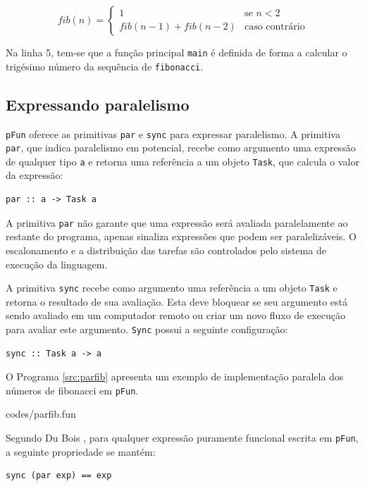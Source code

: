 \documentclass[ccc, pg2]{esinucpel}
\begin{document}
\begin{equation*}
fib(n) = 
	\begin{cases}
	1 & \text{se $n < 2$} \\
	fib(n-1) + fib(n-2) & \text{caso contrário}
	\end{cases}
\end{equation*}

Na linha 5, tem-se que a função principal \texttt{main} é definida de forma a calcular o trigésimo número da sequência de \texttt{fibonacci}.

\subsection{Expressando paralelismo}
{\tt pFun} oferece as primitivas {\tt par} e {\tt sync} para expressar paralelismo. A primitiva {\tt par}, que indica paralelismo em potencial, recebe como argumento uma expressão de qualquer tipo {\tt a} e retorna uma referência a um objeto {\tt Task}, que calcula o valor da expressão:
\begin{verbatim}
par :: a -> Task a
\end{verbatim}

A primitiva {\tt par} não garante que uma expressão será avaliada paralelamente ao restante do programa, apenas sinaliza expressões que podem ser paralelizáveis. O escalonamento e a distribuição das tarefas são controlados pelo sistema de execução da linguagem.

A primitiva {\tt sync} recebe como argumento uma referência a um objeto {\tt Task} e retorna o resultado de sua avaliação. Esta deve bloquear se seu argumento está sendo avaliado em um computador remoto ou criar um novo fluxo de execução para avaliar este argumento. {\tt Sync} possui a seguinte configuração:
\begin{verbatim}
sync :: Task a -> a
\end{verbatim}

O Programa \ref{src:parfib} apresenta um exemplo de implementação paralela dos números de fibonacci em {\tt pFun}.


								 {codes/parfib.fun}

Segundo Du Bois \cite{bib:dubois:pfun}, para qualquer expressão puramente funcional escrita em {\tt pFun}, a seguinte propriedade se mantém:
\begin{verbatim}
sync (par exp) == exp
\end{verbatim}
\end{document}
